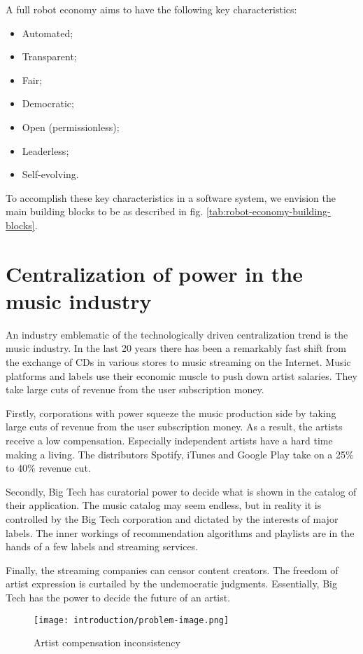 {{A full robot economy aims to have the following key characteristics: 
\begin{itemize}
    \item Automated;
    \item Transparent;
    \item Fair;
    \item Democratic;
    \item Open (permissionless);
    \item Leaderless;
    \item Self-evolving.
\end{itemize}
To accomplish these key characteristics in a software system, we envision the main building blocks to be as described in fig. \ref{tab:robot-economy-building-blocks}.

\section{Centralization of power in the music industry}
An industry %
emblematic of the technologically driven centralization trend is the music industry. In the last 20 years there has been a remarkably fast shift from the exchange of CDs in various stores to music streaming on the Internet. Music platforms and labels use their economic muscle to push down artist salaries. They take large cuts of revenue from the user subscription money.

Firstly, corporations with power squeeze the music production side by taking large cuts of revenue from the user subscription money. As a result, the artists receive a low compensation. Especially independent artists have a hard time making a living. The distributors Spotify, iTunes and Google Play take on a 25\% to 40\% revenue cut.

Secondly, Big Tech has curatorial power to decide what is shown in the catalog of their application. The music catalog may seem endless, but in reality it is controlled by the Big Tech corporation and dictated by the interests of major labels. The inner workings of recommendation algorithms and playlists are in the hands of a few labels and streaming services.

Finally, the streaming companies can censor content creators. The freedom of artist expression is curtailed by the undemocratic judgments. Essentially, Big Tech has the power to decide the future of an artist.

\begin{figure}
    \centering
	\texttt{[image: introduction/problem-image.png]}
	\caption{Artist compensation inconsistency}
\end{figure}

}}
